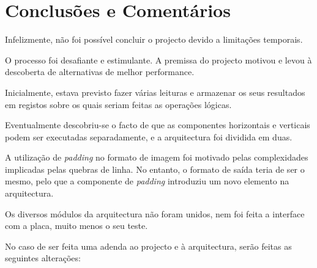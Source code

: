 \documentclass[a4paper]{article}
\begin{document}





\section{Conclusões e Comentários}

Infelizmente, não foi possível concluir o projecto devido a limitações temporais.

O processo foi desafiante e estimulante. A premissa do projecto motivou e levou à descoberta de alternativas de melhor performance.

Inicialmente, estava previsto fazer várias leituras e armazenar os seus resultados em registos sobre os quais seriam feitas as operações lógicas.

Eventualmente descobriu-se o facto de que as componentes horizontais e verticais podem ser executadas separadamente, e a arquitectura foi dividida em duas.

A utilização de \textit{padding} no formato de imagem foi motivado pelas complexidades implicadas pelas quebras de linha. No entanto, o formato de saída teria de ser o mesmo, pelo que a componente de \textit{padding} introduziu um novo elemento na arquitectura.

Os diversos módulos da arquitectura não foram unidos, nem foi feita a interface com a placa, muito menos o seu teste.

No caso de ser feita uma adenda ao projecto e à arquitectura, serão feitas as seguintes alterações:
\end{document}

